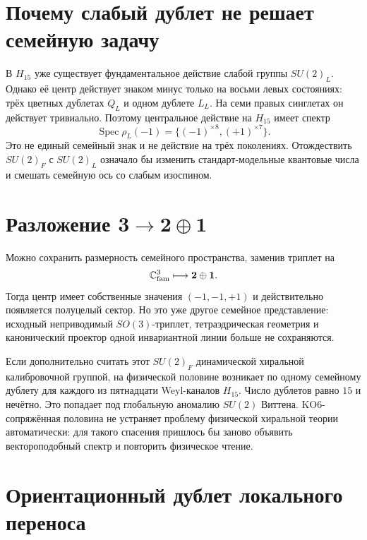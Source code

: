 \section{Почему слабый дублет не решает семейную задачу}

В $H_{15}$ уже существует фундаментальное действие слабой группы
$SU(2)_L$. Однако её центр действует знаком минус только на восьми левых
состояниях: трёх цветных дублетах $Q_L$ и одном дублете $L_L$. На семи
правых синглетах он действует тривиально. Поэтому центральное действие на
$H_{15}$ имеет спектр
\begin{equation}
 \operatorname{Spec}\rho_L(-1)=
 \{(-1)^{\times8},(+1)^{\times7}\}.
\end{equation}
Это не единый семейный знак и не действие на трёх поколениях. Отождествить
$SU(2)_F$ с $SU(2)_L$ означало бы изменить стандарт-модельные квантовые
числа и смешать семейную ось со слабым изоспином.

\section{Разложение
\texorpdfstring{$\mathbf3\to\mathbf2\oplus\mathbf1$}{3 в 2 плюс 1}}

Можно сохранить размерность семейного пространства, заменив триплет на
\begin{equation}
 \mathbb C^3_{\rm fam}\longmapsto\mathbf2\oplus\mathbf1.
 \label{eq:v5-su2-two-plus-one}
\end{equation}
Тогда центр имеет собственные значения $(-1,-1,+1)$ и действительно
появляется полуцелый сектор. Но это уже другое семейное представление:
исходный неприводимый $SO(3)$-триплет, тетраэдрическая геометрия и
канонический проектор одной инвариантной линии больше не сохраняются.

Если дополнительно считать этот $SU(2)_F$ динамической хиральной
калибровочной группой, на физической половине возникает по одному
семейному дублету для каждого из пятнадцати Weyl-каналов $H_{15}$. Число
дублетов равно $15$ и нечётно. Это попадает под глобальную аномалию
$SU(2)$ Виттена. KO6-сопряжённая половина не устраняет проблему
физической хиральной теории автоматически: для такого спасения пришлось
бы заново объявить вектороподобный спектр и повторить физическое чтение.

\section{Ориентационный дублет локального переноса}

